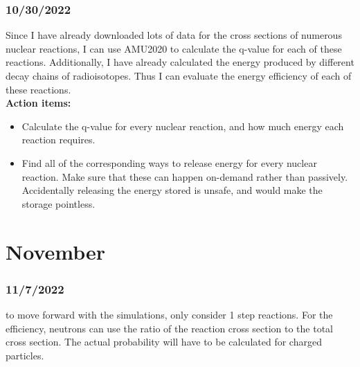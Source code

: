 \documentclass[12pt]{article}
\begin{document}
\subsubsection{10/30/2022}
Since I have already downloaded lots of data for the cross sections of numerous nuclear reactions, I can use AMU2020 to calculate the q-value for each of these reactions. Additionally, I have already calculated the energy produced by different decay chains of radioisotopes. Thus I can evaluate the energy efficiency of each of these reactions. \\
\textbf{Action items:}
\begin{itemize}
    \item Calculate the q-value for every nuclear reaction, and how much energy each reaction requires. 
    \item Find all of the corresponding ways to release energy for every nuclear reaction. Make sure that these can happen on-demand rather than passively. Accidentally releasing the energy stored is unsafe, and would make the storage pointless. 
\end{itemize}
\section{November}
\subsubsection{11/7/2022}
to move forward with the simulations, only consider 1 step reactions. For the efficiency, neutrons can use the ratio of the reaction cross section to the total cross section. The actual probability will have to be calculated for charged particles.
\end{document}
